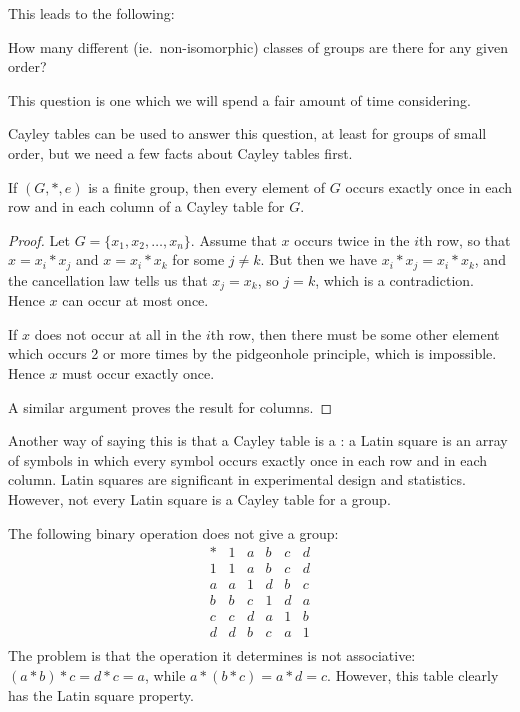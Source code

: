 This leads to the following:

\begin{question}
  How many different (ie.\ non-isomorphic) classes of groups are there for
  any given order?
\end{question}

This question is one which we will spend a fair amount of time considering.

Cayley tables can be used to answer this question, at least for groups of
small order, but we need a few facts about Cayley tables first.

\begin{proposition}
  If $(G, \ast, e)$ is a finite group, then every element of $G$ occurs exactly once
  in each row and in each column of a Cayley table for $G$.
\end{proposition}
\begin{proof}
  Let $G = \{x_{1}, x_{2}, \ldots, x_{n}\}$.  Assume that $x$ occurs twice in
  the $i$th row, so that $x = x_{i} \ast x_{j}$ and $x = x_{i} \ast x_{k}$
  for some $j \ne k$.  But then we have $x_{i} \ast x_{j} = x_{i} \ast x_{k}$,
  and the cancellation law tells us that $x_{j} = x_{k}$, so $j = k$, which is
  a contradiction.  Hence $x$ can occur at most once.
  
  If $x$ does not occur at all in the $i$th row, then there must be some other
  element which occurs 2 or more times by the pidgeonhole principle, which
  is impossible.  Hence $x$ must occur exactly once.
  
  A similar argument proves the result for columns.
\end{proof}

Another way of saying this is that a Cayley table is a : a Latin square is an array of symbols in which every symbol occurs
exactly once in each row and in each column.  Latin squares are significant
in experimental design and statistics.  However, not every Latin square is a 
Cayley table for a group.

\begin{example}
  The following binary operation does not give a group:
  \[
    \begin{array}{c|ccccc}
      \ast & 1 & a & b & c & d \\
      \hline
      1 & 1 & a & b & c & d \\
      a & a & 1 & d & b & c \\
      b & b & c & 1 & d & a \\
      c & c & d & a & 1 & b \\
      d & d & b & c & a & 1 \\
    \end{array}
  \]
  The problem is that the operation it determines is not associative:
  $(a \ast b) \ast c = d \ast c = a$, while $a \ast (b \ast c) = a \ast d = c$.
  However, this table clearly has the Latin square property.
\end{example}

